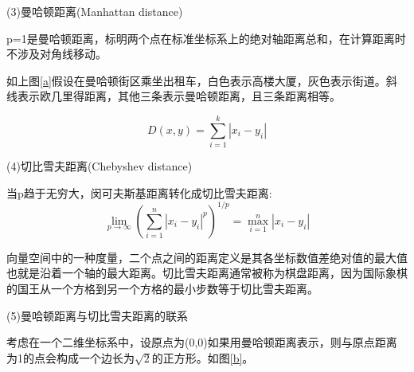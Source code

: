 \documentclass[openbib]{article}
\begin{document}
(3)曼哈顿距离(Manhattan distance)

p=1是曼哈顿距离，标明两个点在标准坐标系上的绝对轴距离总和，在计算距离时不涉及对角线移动。

如上图\ref{a}假设在曼哈顿街区乘坐出租车，白色表示高楼大厦，灰色表示街道。斜线表示欧几里得距离，其他三条表示曼哈顿距离，且三条距离相等。

$$
D(x,y)=\sum_{i=1}^{k}\left| x_i-y_i \right|
$$

(4)切比雪夫距离(Chebyshev distance)

当p趋于无穷大，闵可夫斯基距离转化成切比雪夫距离:
\begin{equation*}
	\lim\limits_{p \to \infty } \left( \sum_{i=1}^{n}\left| x_{i}-y_{i} \right|^{p} \right)^{1/p} = \mathop{max}_{i=1}^n \left| x_{i}-y_{i} \right|
\end{equation*}

向量空间中的一种度量，二个点之间的距离定义是其各坐标数值差绝对值的最大值也就是沿着一个轴的最大距离。切比雪夫距离通常被称为棋盘距离，因为国际象棋的国王从一个方格到另一个方格的最小步数等于切比雪夫距离。

(5)曼哈顿距离与切比雪夫距离的联系

考虑在一个二维坐标系中，设原点为(0,0)如果用曼哈顿距离表示，则与原点距离为1的点会构成一个边长为$\sqrt{2}$的正方形。如图\ref{b}。
\end{document}
